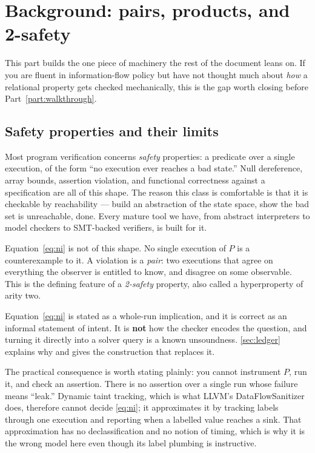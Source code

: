 \section{Background: pairs, products, and 2-safety}
\label{part:background}
\label{sec:twosafety}

This part builds the one piece of machinery the rest of the document leans on.
If you are fluent in information-flow policy but have not thought much about
\emph{how} a relational property gets checked mechanically, this is the gap
worth closing before Part~\ref{part:walkthrough}.

\subsection{Safety properties and their limits}

Most program verification concerns \emph{safety} properties: a predicate over a
single execution, of the form ``no execution ever reaches a bad state.'' Null
dereference, array bounds, assertion violation, and functional correctness
against a specification are all of this shape. The reason this class is
comfortable is that it is checkable by reachability --- build an abstraction of
the state space, show the bad set is unreachable, done. Every mature tool we
have, from abstract interpreters to model checkers to SMT-backed verifiers, is
built for it.

Equation~\eqref{eq:ni} is not of this shape. No single execution of $P$ is a
counterexample to it. A violation is a \emph{pair}: two executions that agree on
everything the observer is entitled to know, and disagree on some observable.
This is the defining feature of a \emph{2-safety} property, also called a
hyperproperty of arity two.

\begin{remark}
\label{rem:notencoding}
Equation~\eqref{eq:ni} is stated as a whole-run implication, and it is correct as
an informal statement of intent. It is \textbf{not} how the checker encodes the
question, and turning it directly into a solver query is a known unsoundness.
\cref{sec:ledger} explains why and gives the construction that replaces it.
\end{remark}

\begin{remark}
The practical consequence is worth stating plainly: you cannot instrument $P$,
run it, and check an assertion. There is no assertion over a single run whose
failure means ``leak.'' Dynamic taint tracking, which is what LLVM's
DataFlowSanitizer does, therefore cannot decide \eqref{eq:ni}; it approximates
it by tracking labels through one execution and reporting when a labelled value
reaches a sink. That approximation has no declassification and no notion of
timing, which is why it is the wrong model here even though its label plumbing
is instructive.
\end{remark}

